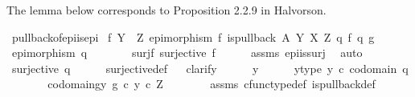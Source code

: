 \begin{isabellebody}
%
\isadelimproof
%
\endisadelimproof
%
\begin{isamarkuptext}%
The lemma below corresponds to Proposition 2.2.9 in Halvorson.%
\end{isamarkuptext}\isamarkuptrue%
\isamarkupfalse%
\ pullback{\isacharunderscore}{\kern0pt}of{\isacharunderscore}{\kern0pt}epi{\isacharunderscore}{\kern0pt}is{\isacharunderscore}{\kern0pt}epi{}{\isacharcolon}{\kern0pt}\isanewline
{}\ {\isachardoublequoteopen}f{\isacharcolon}{\kern0pt}\ Y\ {\isasymrightarrow}\ Z{\isachardoublequoteclose}\ {\isachardoublequoteopen}epimorphism\ f{\isachardoublequoteclose}\ {\isachardoublequoteopen}is{\isacharunderscore}{\kern0pt}pullback\ A\ Y\ X\ Z\ q{}\ f\ q{}\ g{\isachardoublequoteclose}\isanewline
{}\ {\isachardoublequoteopen}epimorphism\ q{}{\isachardoublequoteclose}\ \isanewline
%
\isadelimproof
%
\endisadelimproof
%
\isatagproof
{}\isamarkupfalse%
\ {\isacharminus}{\kern0pt}\ \isanewline
\ \ \isamarkupfalse%
\ surj{\isacharunderscore}{\kern0pt}f{\isacharcolon}{\kern0pt}\ {\isachardoublequoteopen}surjective\ f{\isachardoublequoteclose}\isanewline
\ \ \ \ \isamarkupfalse%
\ assms{\isacharparenleft}{\kern0pt}{}{\isacharcomma}{\kern0pt}{}{\isacharparenright}{\kern0pt}\ epi{\isacharunderscore}{\kern0pt}is{\isacharunderscore}{\kern0pt}surj\ \isamarkupfalse%
\ auto\isanewline
\ \ \isamarkupfalse%
\ {\isachardoublequoteopen}surjective\ {\isacharparenleft}{\kern0pt}q{}{\isacharparenright}{\kern0pt}{\isachardoublequoteclose}\isanewline
\ \ \ \ \isamarkupfalse%
\ surjective{\isacharunderscore}{\kern0pt}def\isanewline
\ \ \isamarkupfalse%
{\isacharparenleft}{\kern0pt}clarify{\isacharparenright}{\kern0pt}\isanewline
\ \ \ \ \isamarkupfalse%
\ y\isanewline
\ \ \ \ \isamarkupfalse%
\ y{\isacharunderscore}{\kern0pt}type{\isacharcolon}{\kern0pt}\ {\isachardoublequoteopen}y\ {\isasymin}\isactrlsub c\ codomain\ q{}{\isachardoublequoteclose}\isanewline
\ \ \ \ \isamarkupfalse%
\ \isamarkupfalse%
\ codomain{\isacharunderscore}{\kern0pt}gy{\isacharcolon}{\kern0pt}\ {\isachardoublequoteopen}g\ {\isasymcirc}\isactrlsub c\ y\ {\isasymin}\isactrlsub c\ Z{\isachardoublequoteclose}\isanewline
\ \ \ \ \ \ \isamarkupfalse%
\ assms{\isacharparenleft}{\kern0pt}{}{\isacharparenright}{\kern0pt}\ cfunc{\isacharunderscore}{\kern0pt}type{\isacharunderscore}{\kern0pt}def\ is{\isacharunderscore}{\kern0pt}pullback{\isacharunderscore}{\kern0pt}def\ \ \isamarkupfalse%

\end{isabellebody}

